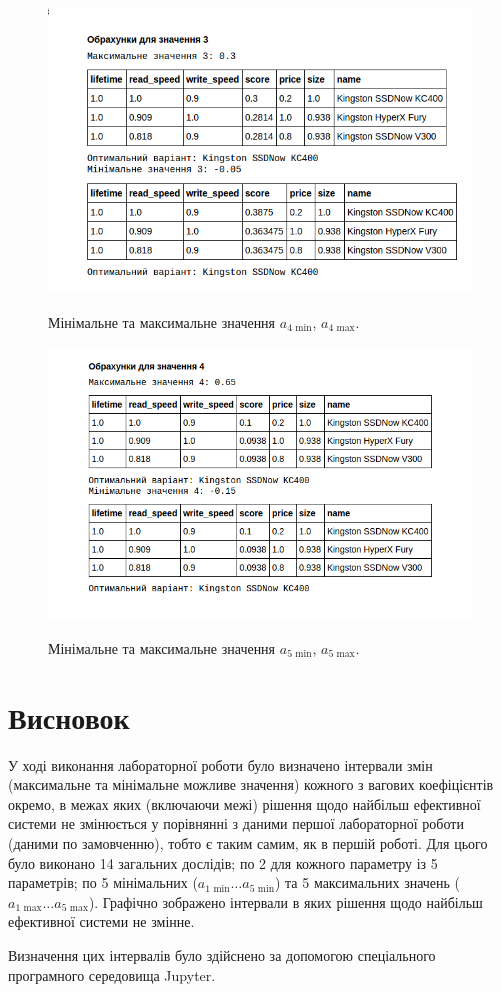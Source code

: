 \begin{figure}[H]
  \centering
  \includegraphics[width=.9\linewidth]{images/lab2/min_max_4.png}
  \label{f:min_max_a_4} 
  \caption{Мінімальне та максимальне значення $a_{4 \text{ min}}$, $a_{4 \text{ max}}$.}
\end{figure}
\begin{figure}[H]
  \centering
  \includegraphics[width=.9\linewidth]{images/lab2/min_max_5.png}
  \label{f:min_max_a_5} 
  \caption{Мінімальне та максимальне значення $a_{5 \text{ min}}$, $a_{5 \text{ max}}$.}
\end{figure}

\newpage

\section*{Висновок}
У ході виконання лабораторної роботи було визначено інтервали змін (максимальне та мінімальне
можливе значення) кожного з вагових коефіцієнтів окремо, в межах яких (включаючи межі) рішення щодо
найбільш ефективної системи не змінюється у порівнянні з даними першої лабораторної роботи (даними
по замовченню), тобто є таким самим, як в першій роботі. Для цього було виконано 14 загальних
дослідів; по 2 для кожного параметру із 5 параметрів; по 5 мінімальних
($a_{1 \text{ min}} \ldots a_{5 \text{ min}}$) та 5 максимальних значень
($a_{1 \text{ max}} \ldots a_{5 \text{ max}}$). Графічно зображено інтервали в яких рішення щодо
найбільш ефективної системи не змінне.

Визначення цих інтервалів було здійснено за допомогою спеціального програмного середовища Jupyter.
